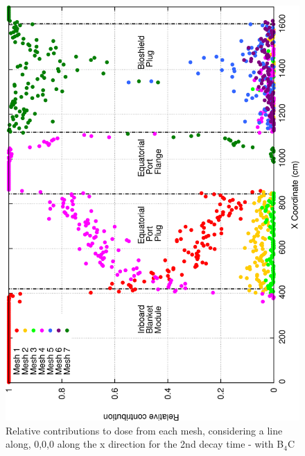 \documentclass[12pt]{article}
\begin{document}
\begin{figure}[ht!]
\centering
\includegraphics[clip,scale=0.25]{../plots/crosstalk/b4c/ep/dc2_rel.png}
\caption{Relative contributions to dose from each mesh, considering a line along, 
         0,0,0 along the x direction for the 2nd decay time - with B$_4$C }
\label{fig:b4c_ct_ep_dc2_rel}
\end{figure}

\newpage
\clearpage
\end{document}
